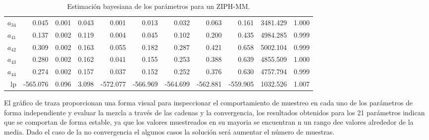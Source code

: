 \documentclass[a4paper]{article}\usepackage[]{graphicx}\usepackage[]{color}
\begin{document}
\begin{table}[ht]
{\begin{tabular}{rrrrrrrrrrr}
  $a_{34}$ & 0.045 & 0.001 & 0.043 & 0.001 & 0.013 & 0.032 & 0.063 & 0.161 & 3481.429 & 1.000 \\ 
  $a_{41}$ & 0.137 & 0.002 & 0.119 & 0.004 & 0.045 & 0.102 & 0.200 & 0.435 & 4984.285 & 0.999 \\ 
  $a_{42}$ & 0.309 & 0.002 & 0.163 & 0.055 & 0.182 & 0.287 & 0.421 & 0.658 & 5002.104 & 0.999 \\ 
  $a_{43}$ & 0.280 & 0.002 & 0.162 & 0.041 & 0.155 & 0.253 & 0.388 & 0.639 & 4855.509 & 1.000 \\ 
  $a_{44}$ & 0.274 & 0.002 & 0.157 & 0.037 & 0.152 & 0.252 & 0.376 & 0.630 & 4757.794 & 0.999 \\ 
  lp & -565.076 & 0.096 & 3.098 & -572.077 & -566.969 & -564.699 & -562.881 & -559.905 & 1032.526 & 1.007 \\ 
   \hline
\end{tabular}
}
\caption{Estimación bayesiana de los parámetros para un ZIPH-MM.} 
\end{table}


El gráfico de traza proporcionan una forma visual para inspeccionar el comportamiento de muestreo en cada uno de los parámetros de forma independiente y evaluar la mezcla a través de las cadenas y la convergencia, los resultados obtenidos para los 21 parámetros indican que se comportan de forma estable, ya que los valores muestreados en su mayoria se encuentran n un rango dee valores alrededor de la media. Dado el caso de la no convergencia el algunos casos la solución será aumentar el número de muestras.
\end{document}
